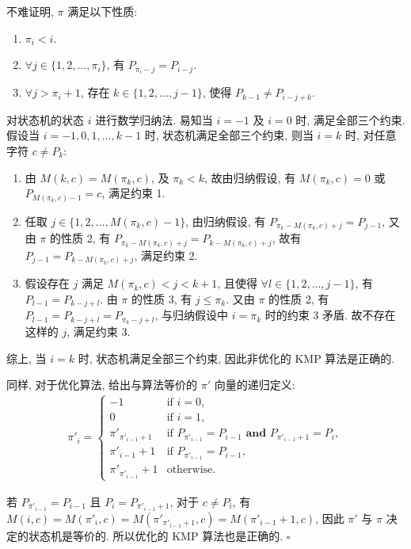 \documentclass{ctexart}
\def\QED{\hfill $\square$}
\begin{document}
不难证明, $\pi$ 满足以下性质:
\begin{enumerate}[nosep, left=4em]
    \item $\pi_i < i$.
    \item $\forall j\in\{1, 2,\ldots, \pi_i\}$,
          有 $P_{\pi_i-j} = P_{i-j}$.
    \item $\forall j > \pi_i+1$, 存在 $k\in \{1, 2,\ldots, j-1\}$,
          使得 $P_{k-1} \ne P_{i-j+k}$.
\end{enumerate}

对状态机的状态 $i$ 进行数学归纳法. 易知当 $i=-1$ 及 $i=0$ 时,
满足全部三个约束. 假设当 $i=-1, 0, 1, \ldots, k-1$ 时, 状态机满足全部三个约束,
则当 $i=k$ 时, 对任意字符 $c\ne P_k$:
\begin{enumerate}[nosep, label=\arabic*)]
    \item 由 $M(k,c)=M(\pi_{k},c)$, 及 $\pi_k < k$,
          故由归纳假设, 有 $M(\pi_k, c)=0$ 或 $P_{M(\pi_k,c)-1}=c$, 满足约束 1.

    \item 任取 $j\in\{1,2,\ldots,M(\pi_k,c)-1\}$, 由归纳假设, 有
          $P_{\pi_k-M(\pi_k,c)+j}=P_{j-1}$, 又由 $\pi$ 的性质 2, 有
          $P_{\pi_k-M(\pi_k,c)+j}=P_{k-M(\pi_k,c)+j}$, 故有
          $P_{j-1}=P_{k-M(\pi_k,c)+j}$, 满足约束 2.

    \item 假设存在 $j$ 满足 $M(\pi_k,c) < j < k+1$,
          且使得 $\forall l\in\{1,2,\ldots, j-1\}$,
          有 $P_{l-1}=P_{k-j+l}$. 由 $\pi$ 的性质 3,
          有 $j\le \pi_k$. 又由 $\pi$ 的性质 2,
          有 $P_{l-1}=P_{k-j+l}=P_{\pi_k-j+l}$,
          与归纳假设中 $i=\pi_k$ 时的约束 3 矛盾.
          故不存在这样的 $j$, 满足约束 3.
\end{enumerate}

综上, 当 $i=k$ 时, 状态机满足全部三个约束, 因此非优化的 KMP 算法是正确的.

同样, 对于优化算法, 给出与算法等价的 $\pi'$ 向量的递归定义:
\begin{gather*}
    \pi'_i = \begin{cases}
        -1                  & \textrm{if } i=0,                                                              \\
        0                   & \textrm{if } i=1,                                                              \\
        \pi'_{\pi'_{i-1}+1} & \textrm{if } P_{\pi'_{i-1}} = P_{i-1} \textbf{ and } P_{\pi'_{i-1}+1} = P_{i}, \\
        \pi'_{i-1}+1        & \textrm{if } P_{\pi'_{i-1}} = P_{i-1},                                         \\
        \pi'_{\pi'_{i-1}}+1 & \textrm{otherwise}.
    \end{cases}
\end{gather*}

若 $P_{\pi'_{i-1}} = P_{i-1}$ 且
$P_i=P_{\pi'_{i-1}+1}$, 对于 $c\ne P_i$,
有 $M(i,c)=M(\pi'_i, c)=M(\pi'_{\pi'_{i-1}+1}, c) = M(\pi'_{i-1}+1,c)$,
因此 $\pi'$ 与 $\pi$ 决定的状态机是等价的.
所以优化的 KMP 算法也是正确的.
\QED
\end{document}
